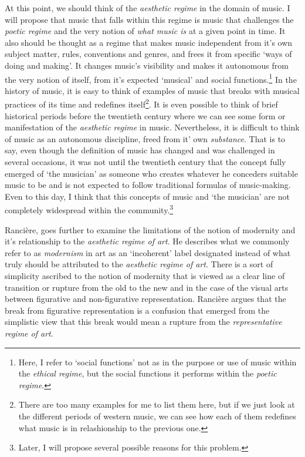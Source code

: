 At this point, we should think of the \emph{aesthetic regime} in the domain of music. I will propose that music that falls within this regime is music that challenges the \emph{poetic regime} and the very notion of \emph{what music is} at a given point in time. It also should be thought as a regime that makes music independent from it's own subject matter, rules, conventions and genres, and frees it from specific `ways of doing and making'. It changes music's visibility and makes it autonomous from the very notion of itself, from it's expected `musical' and social functions.\footnote{Here, I refer to `social functions' not as in the purpose or use of music within the \emph{ethical regime}, but the social functions it performs within the \emph{poetic regime}.} In the history of music, it is easy to think of examples of music that breaks with musical practices of its time and redefines itself\footnote{There are too many examples for me to list them here, but if we just look at the different periods of western music, we can see how each of them redefines what music is in relashionship to the previous one.}. It is even possible to think of brief historical periods before the twentieth century where we can see some form or manifestation of the \emph{aesthetic regime} in music. Nevertheless, it is difficult to think of music as an autonomous discipline, freed from it' own \emph{substance}. That is to say, even though the definition of music has changed and was challenged in several occasions, it was not until the twentieth century that the concept fully emerged of `the musician' as someone who creates whatever he conceders suitable music to be and is not expected to follow traditional formulas of music-making. Even to this day, I think that this concepts of music and `the musician' are not completely widespread within the community.\footnote{Later, I will propose several possible reasons for this problem.}

Ranci\`{e}re, goes further to examine the limitations of the notion of modernity and it's relationship to the \emph{aesthetic regime of art}. He describes what we commonly refer to as \emph{modernism} in art as an `incoherent' label designated instead of what truly should be attributed to the \emph{aesthetic regime of art}. There is a sort of simplicity ascribed to the notion of modernity that is viewed as a clear line of transition or rupture from the old to the new and in the case of the visual arts between figurative and non-figurative representation. Ranci\`{e}re argues that the break from figurative representation is a confusion that emerged from the simplistic view that this break would mean a rupture from the \emph{representative regime of art}.

